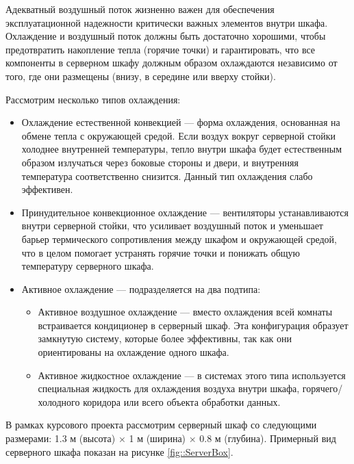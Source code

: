 Адекватный воздушный поток жизненно важен для обеспечения эксплуатационной надежности критически важных 
элементов внутри шкафа. Охлаждение и воздушный поток должны быть достаточно хорошими, чтобы предотвратить 
накопление тепла (горячие точки) и гарантировать, что все компоненты в серверном шкафу должным образом охлаждаются независимо от того, где они размещены (внизу, в середине или вверху стойки).

Рассмотрим несколько типов охлаждения:

\begin{itemize}

	\item Охлаждение естественной конвекцией --- форма охлаждения, основанная на обмене тепла с окружающей средой. Если воздух вокруг серверной стойки холоднее внутренней температуры, тепло внутри шкафа будет естественным образом излучаться через боковые стороны и двери, и внутренняя температура соответственно снизится. Данный тип охлаждения слабо эффективен.
	
	\item Принудительное конвекционное охлаждение --- вентиляторы устанавливаются внутри серверной стойки, что усиливает воздушный поток и уменьшает барьер термического сопротивления между шкафом и окружающей средой, что в целом помогает устранять горячие точки и понижать общую температуру
	серверного шкафа.
	
	\item Активное охлаждение --- подразделяется на два подтипа:
	
	\begin{itemize}
		
		\item Активное воздушное охлаждение --- вместо охлаждения всей комнаты встраивается кондиционер в серверный шкаф. Эта конфигурация образует замкнутую систему, которые более эффективны, так как они ориентированы на охлаждение одного шкафа.
		
		\item Активное жидкостное охлаждение --- в системах этого типа используется специальная жидкость для охлаждения воздуха внутри шкафа, горячего/холодного коридора или всего объекта обработки данных.
	
	\end{itemize}

\end{itemize}

В рамках курсового проекта рассмотрим серверный шкаф со следующими размерами: 1.3 м (высота) $\times$ 1 м (ширина) $\times$ 0.8 м (глубина). Примерный вид серверного шкафа показан на рисунке \ref{fig::ServerBox}.

